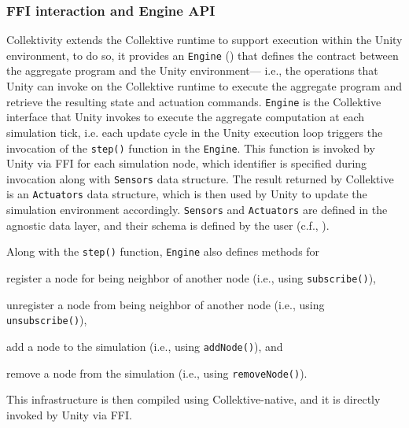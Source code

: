 \subsubsection{\ac{FFI} interaction and Engine API}

Collektivity extends the Collektive runtime to support execution within the Unity environment,
to do so, it provides an \texttt{Engine} ()
that defines the contract between the aggregate program and the Unity environment---%
i.e., the operations that Unity can invoke on the Collektive runtime to execute the aggregate program and retrieve the resulting state and actuation commands.
%
\texttt{Engine} is the Collektive interface that Unity invokes to execute the aggregate computation at each simulation tick,
i.e. each update cycle in the Unity execution loop triggers the invocation 
of the \texttt{step()} function in the \texttt{Engine}.
%
This function is invoked by Unity via \ac{FFI} for each simulation node, 
which identifier is specified during invocation along with \texttt{Sensors} data structure.
%
The result returned by Collektive is an \texttt{Actuators} data structure,
which is then used by Unity to update the simulation environment accordingly.
%
\texttt{Sensors} and \texttt{Actuators} are defined in the agnostic data layer,
and their schema is defined by the user (c.f., ).



Along with the \texttt{step()} function,
\texttt{Engine} also defines methods for
\begin{inlinelist}
    \item register a node for being neighbor of another node (i.e., using \texttt{subscribe()}), 
    \item unregister a node from being neighbor of another node (i.e., using \texttt{unsubscribe()}),
    \item add a node to the simulation (i.e., using \texttt{addNode()}), and
    \item remove a node from the simulation (i.e., using \texttt{removeNode()}).  
\end{inlinelist}
%
This infrastructure is then compiled using Collektive-native,
and it is directly invoked by Unity via \ac{FFI}.

